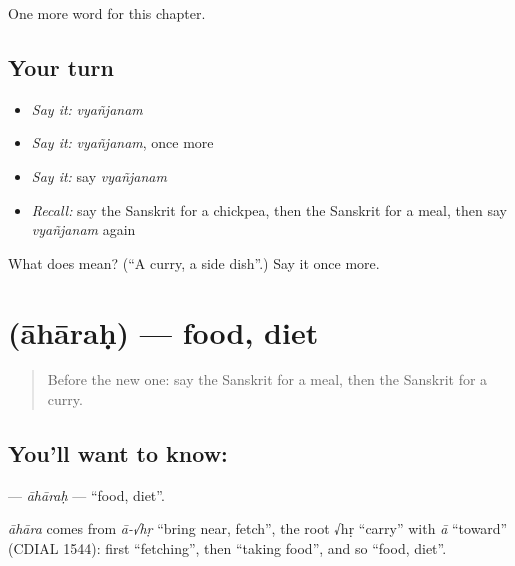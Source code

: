 \begin{grammarlens}[title={What you've built}]
One more word for this chapter.
\end{grammarlens}

\subsection*{Your turn}
\begin{itemize}
\raggedright
  \item \emph{Say it:} \emph{vyañjanam}
  \item \emph{Say it:} \emph{vyañjanam}, once more
  \item \emph{Say it:} say \emph{vyañjanam}
  \item \emph{Recall:} say the Sanskrit for a chickpea, then the Sanskrit for a meal, then say \emph{vyañjanam} again
\end{itemize}

\begin{tcolorbox}[breakable,colback=teal!4,colframe=teal!35!black,title={Before you move on}]
What does  mean? (\textquotedblleft{}A curry, a side dish\textquotedblright{}.) Say it once more.
\end{tcolorbox}
\section[\texorpdfstring{\sk{आहारः} (āhāraḥ)}{आहारः (āhāraḥ)}]{ (āhāraḥ) — food, diet}

\label{lesson:SA-C160-aharah}



\begin{quote}
Before the new one: say the Sanskrit for a meal, then the Sanskrit for a curry.
\end{quote}

\subsection*{You'll want to know: }
\textbf{} — \emph{āhāraḥ} — \textquotedblleft{}food, diet\textquotedblright{}.

\begin{cousinweb}
\emph{āhāra} comes from \emph{ā-√hṛ} \textquotedblleft{}bring near, fetch\textquotedblright{}, the root √hṛ \textquotedblleft{}carry\textquotedblright{} with \emph{ā} \textquotedblleft{}toward\textquotedblright{} (CDIAL 1544): first \textquotedblleft{}fetching\textquotedblright{}, then \textquotedblleft{}taking food\textquotedblright{}, and so \textquotedblleft{}food, diet\textquotedblright{}.
\end{cousinweb}

